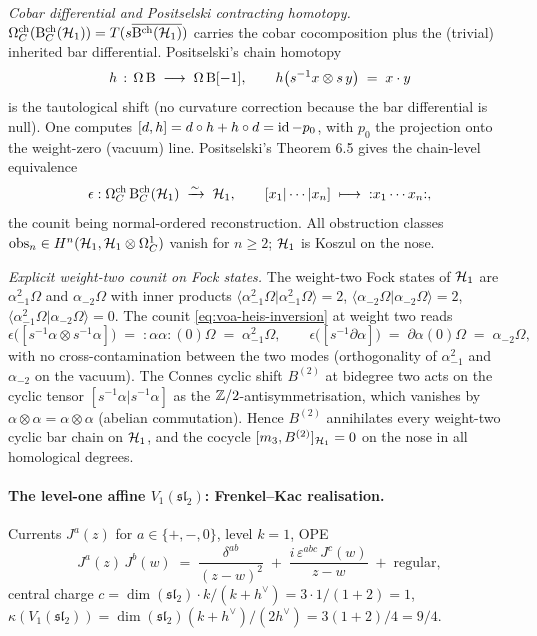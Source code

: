 \emph{Cobar differential and Positselski contracting homotopy.}
$\Omega^{\mathrm{ch}}_C(\mathrm{B}^{\mathrm{ch}}_C(\mathcal{H}_1)) = T(s\overline{\mathrm{B}^{\mathrm{ch}}(\mathcal{H}_1)})$
carries the cobar cocomposition plus the (trivial) inherited bar
differential. Positselski's chain homotopy
\begin{equation}
\label{eq:voa-heis-homotopy}
  h\,:\, \Omega\,\mathrm{B} \;\longrightarrow\; \Omega\,\mathrm{B}[-1], \qquad
  h\bigl(s^{-1}x \otimes s\,y\bigr) \;=\; x\cdot y
\end{equation}
is the tautological shift (no curvature correction because the bar
differential is null). One computes
$[d, h] = d\circ h + h\circ d = \operatorname{id} - p_0$, with $p_0$ the projection
onto the weight-zero (vacuum) line. Positselski's Theorem 6.5 gives
the chain-level equivalence
\begin{equation}
\label{eq:voa-heis-inversion}
  \epsilon : \Omega^{\mathrm{ch}}_C\,\mathrm{B}^{\mathrm{ch}}_C(\mathcal{H}_1) \;\xrightarrow{\sim}\; \mathcal{H}_1, \qquad
  [x_1|\cdots|x_n] \;\longmapsto\; {:}x_1\cdots x_n{:},
\end{equation}
the counit being normal-ordered reconstruction. All obstruction
classes $\mathrm{obs}_n \in H^n(\mathcal{H}_1, \mathcal{H}_1 \otimes \Omega^1_C)$
vanish for $n \geq 2$; $\mathcal{H}_1$ is Koszul on the nose.

\emph{Explicit weight-two counit on Fock states.} The weight-two
Fock states of $\mathcal{H}_1$ are
$\alpha_{-1}^2\Omega$ and $\alpha_{-2}\Omega$ with inner products
$\langle\alpha_{-1}^2\Omega|\alpha_{-1}^2\Omega\rangle = 2$,
$\langle\alpha_{-2}\Omega|\alpha_{-2}\Omega\rangle = 2$,
$\langle\alpha_{-1}^2\Omega|\alpha_{-2}\Omega\rangle = 0$. The counit
\eqref{eq:voa-heis-inversion} at weight two reads
\[
  \epsilon\bigl([s^{-1}\alpha \otimes s^{-1}\alpha]\bigr) \;=\; {:}\alpha\alpha{:}(0)\Omega \;=\; \alpha_{-1}^2\Omega,
  \qquad \epsilon\bigl([s^{-1}\partial\alpha]\bigr) \;=\; \partial\alpha(0)\Omega \;=\; \alpha_{-2}\Omega,
\]
with no cross-contamination between the two modes (orthogonality of
$\alpha_{-1}^2$ and $\alpha_{-2}$ on the vacuum). The Connes cyclic
shift $B^{(2)}$ at bidegree two acts on the cyclic tensor
$[s^{-1}\alpha | s^{-1}\alpha]$ as the $\mathbb{Z}/2$-antisymmetrisation,
which vanishes by $\alpha\otimes\alpha = \alpha\otimes\alpha$
(abelian commutation). Hence $B^{(2)}$ annihilates every weight-two
cyclic bar chain on $\mathcal{H}_1$, and the cocycle $[m_3, B^{(2)}]_{\mathcal{H}_1}
= 0$ on the nose in all homological degrees.

\paragraph{The level-one affine $V_1(\mathfrak{sl}_2)$: Frenkel--Kac realisation.}
Currents $J^a(z)$ for $a \in \{+,-,0\}$, level $k = 1$, OPE
\begin{equation}
\label{eq:voa-V1sl2-ope}
  J^a(z)\,J^b(w) \;=\; \frac{\delta^{ab}}{(z-w)^2} \;+\; \frac{i\,\varepsilon^{abc}\,J^c(w)}{z - w}
  \;+\; \mathrm{regular},
\end{equation}
central charge $c = \dim(\mathfrak{sl}_2)\cdot k/(k + h^\vee) =
3\cdot 1/(1+2) = 1$, $\kappa(V_1(\mathfrak{sl}_2)) =
\dim(\mathfrak{sl}_2)(k + h^\vee)/(2 h^\vee) = 3(1+2)/4 = 9/4$.

